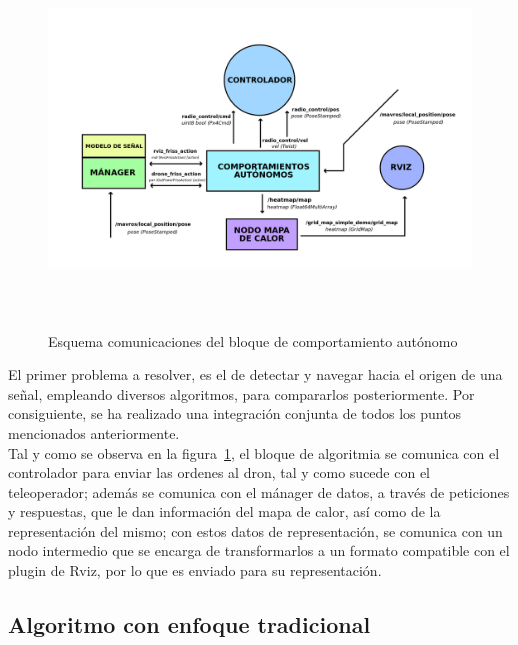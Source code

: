 \begin{figure} [H]
    \begin{center}
    \includegraphics[height=10cm]{imagenes/cap4/5_esquema_comp_auto.png}
    \end{center}
	\caption[Esquema comunicaciones del bloque de comportamiento autónomo]{Esquema comunicaciones del bloque de comportamiento autónomo}
	\label{fig:esquema_auto}
\end{figure}

El primer problema a resolver, es el de detectar y navegar hacia el origen de una señal, empleando diversos algoritmos, para compararlos posteriormente. Por consiguiente, se ha realizado una integración conjunta de todos los puntos mencionados anteriormente.\\

Tal y como se observa en la figura~\ref{fig:esquema_auto}, el bloque de algoritmia se comunica con el controlador para enviar las ordenes al dron, tal y como sucede con el teleoperador; además se comunica con el mánager de datos, a través de peticiones y respuestas, que le dan información del mapa de calor, así como de la representación del mismo; con estos datos de representación, se comunica con un nodo intermedio que se encarga de transformarlos a un formato compatible con el plugin de Rviz, por lo que es enviado para su representación.

\subsection{Algoritmo con enfoque tradicional}
\label{subsec:algoritmo_sf}

